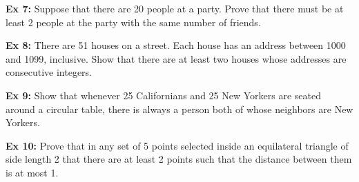 \documentclass[fleqn]{article}
\theoremstyle{definition}
\begin{document}
\textbf{Ex 7:} Suppose that there are 20 people at a party. Prove that there must be at least 2 people at the party with the same number of friends. 


\newpage


\textbf{Ex 8:} There are 51 houses on a street. Each house has an address between 1000 and 1099, inclusive. Show that there are at least two houses whose addresses are consecutive integers. 


\vspace{6cm}


\textbf{Ex 9:} Show that whenever 25 Californians and 25 New Yorkers are seated around a circular table, there is always a person both of whose neighbors are New Yorkers. 



\newpage 

\textbf{Ex 10:} Prove that in any set of 5 points selected inside an equilateral triangle of side length 2 that there are at least 2 points such that the distance between them is at most 1. 

\vspace{10cm}


\end{document}
